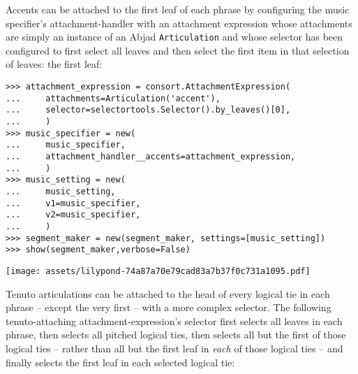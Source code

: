 \noindent Accents can be attached to the first leaf of each phrase by
configuring the music specifier's attachment-handler with an attachment
expression whose attachments are simply an instance of an Abjad
\texttt{Articulation} and whose selector has been configured to first select
all leaves and then select the first item in that selection of leaves: the
first leaf:

\begin{comment}
<abjad>[stylesheet=../consort.ily]
attachment_expression = consort.AttachmentExpression(
    attachments=Articulation('accent'),
    selector=selectortools.Selector().by_leaves()[0],
    )
music_specifier = new(
    music_specifier,
    attachment_handler__accents=attachment_expression,
    )
music_setting = new(
    music_setting,
    v1=music_specifier,
    v2=music_specifier,
    )
segment_maker = new(segment_maker, settings=[music_setting])
show(segment_maker,verbose=False)
</abjad>
\end{comment}

\begin{abjadbookoutput}
\begin{singlespacing}
\vspace{-0.5\baselineskip}
\begin{verbatim}
>>> attachment_expression = consort.AttachmentExpression(
...     attachments=Articulation('accent'),
...     selector=selectortools.Selector().by_leaves()[0],
...     )
>>> music_specifier = new(
...     music_specifier,
...     attachment_handler__accents=attachment_expression,
...     )
>>> music_setting = new(
...     music_setting,
...     v1=music_specifier,
...     v2=music_specifier,
...     )
>>> segment_maker = new(segment_maker, settings=[music_setting])
>>> show(segment_maker,verbose=False)
\end{verbatim}
\noindent\texttt{[image: assets/lilypond-74a87a70e79cad83a7b37f0c731a1095.pdf]}
\end{singlespacing}
\end{abjadbookoutput}

\noindent Tenuto articulations can be attached to the head of every logical tie
in each phrase -- except the very first -- with a more complex selector. The
following tenuto-attaching attachment-expression's selector first selects all
leaves in each phrase, then selects all pitched logical ties, then selects all
but the first of those logical ties -- rather than all but the first leaf in
\emph{each} of those logical ties -- and finally selects the first leaf in each
selected logical tie:


